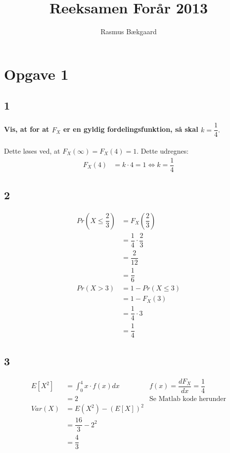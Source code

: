 \documentclass{article}
\title{Reeksamen Forår 2013}
\author{Rasmus Bækgaard}
\begin{document}
\maketitle

\section*{Opgave 1}

\subsection*{1}
\paragraph{Vis, at for at $F_X$ er en gyldig fordelingsfunktion, så skal $k = \dfrac{1}{4}.$} %
\label{par:paragraph_name}

Dette løses ved, at $F_X(\infty) = F_X(4) = 1$.
Dette udregnes:
\begin{align}
F_X(4) &= k \cdot 4 = 1 \Leftrightarrow k = \dfrac{1}{4}
\end{align}

\subsection*{2} %
\label{sub:2}


\begin{align}
Pr\left(X \leq \dfrac{2}{3} \right) &= F_X \left( \dfrac{2}{3} \right) \\
	&= \dfrac{1}{4} \cdot \dfrac{2}{3} \\
	&= \dfrac{2}{12}  \\
	&= \dfrac{1}{6}  \\
Pr\left(X > 3 \right) &= 1- Pr\left(X \leq 3 \right) \\
	&= 1- F_X \left( 3 \right) \\
	&= \dfrac{1}{4} \cdot 3 \\
	&= \dfrac{1}{4}
\end{align}


\subsection*{3} %
\label{sub:3}


\begin{align}
E\left[X^2\right] &= \int_0^4 x \cdot f(x) dx & f(x) = \dfrac{d F_X}{dx} = \dfrac{1}{4} \\
	&= 2 & \text{Se Matlab kode herunder} \\
Var(X) &= E\left(X^2 \right) - \left( E[X]\right)^2 \\
	&= \dfrac{16}{3} - 2^2 \\
	&= \dfrac{4}{3}
\end{align}
\end{document}
